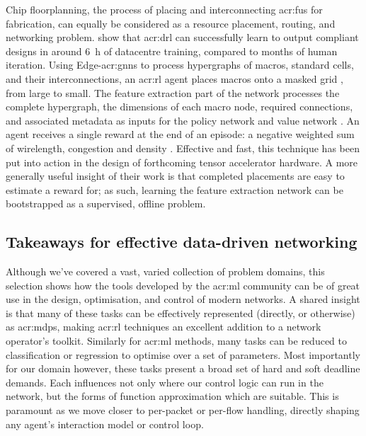 Chip floorplanning, the process of placing and interconnecting \glspl{acr:fu} for fabrication, can equally be considered as a resource placement, routing, and networking problem.
\Textcite{Mirhoseini2021} show that \gls{acr:drl} can successfully learn to output compliant designs in around \qty{6}{\hour} of datacentre training, compared to months of human iteration.
Using Edge-\glspl{acr:gnn} to process hypergraphs of macros, standard cells, and their interconnections, an \gls{acr:rl} agent places macros onto a masked  grid \prllitact, from large to small.
The feature extraction part of the network processes the complete hypergraph, the dimensions of  each macro node, required connections, and associated metadata as inputs for the policy network and value network \prllitstate.
An agent receives a single reward at the end of an episode: a negative weighted sum of wirelength, congestion and density \prllitreward.
Effective and fast, this technique has been put into action in the design of forthcoming tensor accelerator hardware.%
A more generally useful insight of their work is that completed placements are easy to estimate a reward for; as such, learning the feature extraction network can be bootstrapped as a supervised, offline problem.

\subsection{Takeaways for effective data-driven networking}\label{sec:ddn-use-takeaways}
Although we've covered a vast, varied collection of problem domains, this selection shows how the tools developed by the \gls{acr:ml} community can be of great use in the design, optimisation, and control of modern networks.
A shared insight is that many of these tasks can be effectively represented (directly, or otherwise) as \glspl{acr:mdp}, making \gls{acr:rl} techniques an excellent addition to a network operator's toolkit.
Similarly for \gls{acr:ml} methods, many tasks can be reduced to classification or regression to optimise over a set of parameters.
Most importantly for our domain however, these tasks present a broad set of hard and soft deadline demands. 
Each influences not only where our control logic can run in the network, but the forms of function approximation which are suitable.
This is paramount as we move closer to per-packet or per-flow handling, directly shaping any agent's interaction model or control loop.

